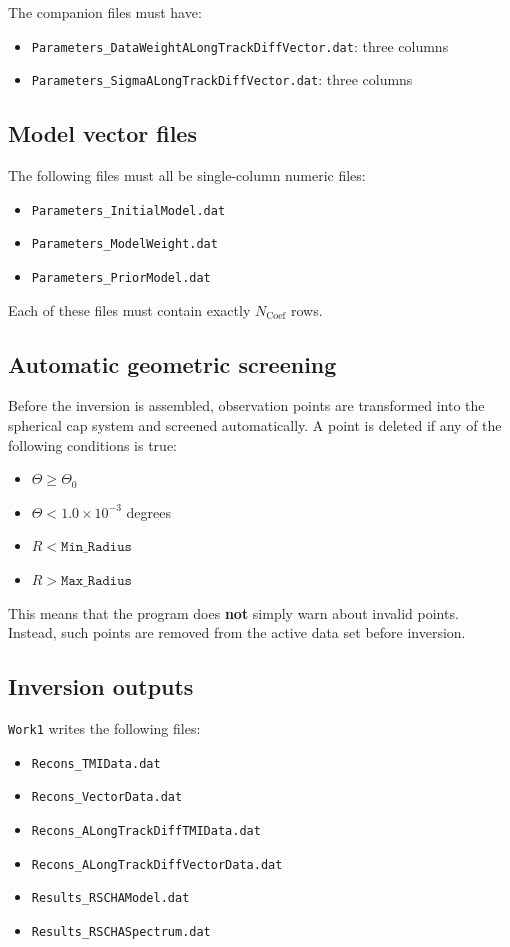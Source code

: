 \documentclass[11pt,a4paper]{article}
\begin{document}
The companion files must have:
\begin{itemize}
  \item \texttt{Parameters\_DataWeightALongTrackDiffVector.dat}: three columns
  \item \texttt{Parameters\_SigmaALongTrackDiffVector.dat}: three columns
\end{itemize}

\subsection{Model vector files}

The following files must all be single-column numeric files:
\begin{itemize}
  \item \texttt{Parameters\_InitialModel.dat}
  \item \texttt{Parameters\_ModelWeight.dat}
  \item \texttt{Parameters\_PriorModel.dat}
\end{itemize}

Each of these files must contain exactly $N_{\mathrm{Coef}}$ rows.

\subsection{Automatic geometric screening}

Before the inversion is assembled, observation points are transformed into the spherical cap system and screened automatically. A point is deleted if any of the following conditions is true:
\begin{itemize}
  \item $\Theta \ge \Theta_0$
  \item $\Theta < 1.0 \times 10^{-3}$ degrees
  \item $R < \texttt{Min\_Radius}$
  \item $R > \texttt{Max\_Radius}$
\end{itemize}

This means that the program does \textbf{not} simply warn about invalid points. Instead, such points are removed from the active data set before inversion.

\subsection{Inversion outputs}

\texttt{Work1} writes the following files:
\begin{itemize}
  \item \texttt{Recons\_TMIData.dat}
  \item \texttt{Recons\_VectorData.dat}
  \item \texttt{Recons\_ALongTrackDiffTMIData.dat}
  \item \texttt{Recons\_ALongTrackDiffVectorData.dat}
  \item \texttt{Results\_RSCHAModel.dat}
  \item \texttt{Results\_RSCHASpectrum.dat}
\end{itemize}
\end{document}
